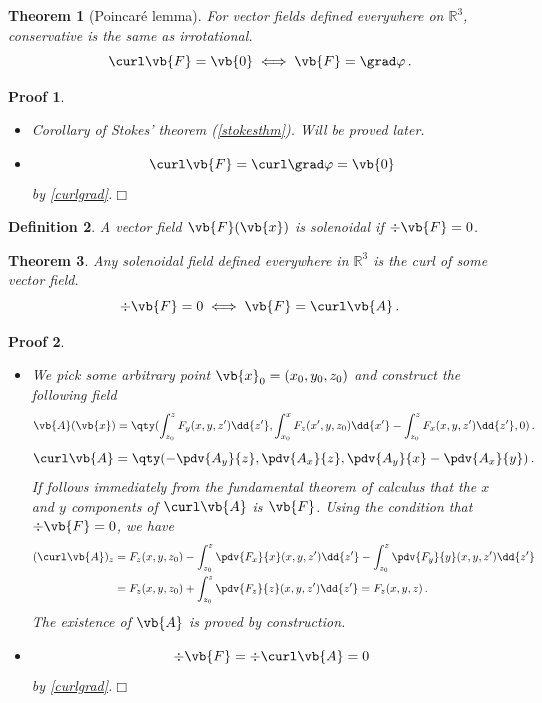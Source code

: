 \documentclass{article}
\theoremstyle{plain}\theoremheaderfont{\normalfont\itshape}\theorembodyfont{\rmfamily}\theoremseparator{.}\newtheorem*{rem}{Remark}\newtheorem*{ex}{Example}\newtheorem*{proof}{Proof}\newtheorem*{altp}{Alternative proof}
\theoremstyle{plain}\theoremheaderfont{\normalfont\bfseries}\theorembodyfont{\rmfamily}\theoremseparator{.}\newtheorem{thm}{Theorem}[section]\newtheorem{lem}[thm]{Lemma}\newtheorem{prop}[thm]{Proposition}\newtheorem*{cor}{Corollary}\newtheorem{defn}[thm]{Definition}\newtheorem{clm}[thm]{Claim}\newtheorem{clminproof}{Claim}
\theoremstyle{break}\theoremheaderfont{\normalfont\itshape}\theorembodyfont{\rmfamily}\theoremseparator{.\medskip}\newtheorem*{proofskip}{Proof}\newtheorem*{exs}{Examples}\newtheorem*{rems}{Remarks}
\theoremstyle{break}\theoremheaderfont{\normalfont\bfseries}\theorembodyfont{\rmfamily}\theoremseparator{.\medskip}\newtheorem{lemskip}[thm]{Lemma}\newtheorem{defnskip}[thm]{Definition}\newtheorem{propskip}[thm]{Proposition}\newtheorem{thmskip}[thm]{Theorem}
\numberwithin{equation}{section}
\newcommand{\qed}{\hfill\ensuremath{\Box}}
\begin{document}
	\begin{thm}[Poincar\'{e} lemma]\label{poincare}
		For vector fields defined everywhere on \(\mathbb{R}^3\), conservative is the same as irrotational.
		\[\curl\vb{F}=\vb{0}\iff\vb{F}=\grad\varphi\,.\]
	\end{thm}
	\begin{proofskip}
		\begin{itemize}
			\item[(\(\Rightarrow\))] Corollary of Stokes' theorem (\cref{stokesthm}). Will be proved later.
			\item[(\(\Leftarrow\))]
			\[\curl\vb{F}=\curl\grad\varphi=\vb{0}\]
			by \cref{curlgrad}.\qed
		\end{itemize}
	\end{proofskip}

	\begin{defn}
		A vector field \(\vb{F}(\vb{x})\) is \textit{solenoidal} if \(\div{\vb{F}}=0\).
	\end{defn}
	\begin{thm}
		Any solenoidal field defined everywhere in \(\mathbb{R}^3\) is the curl of some vector field.
		\[\div\vb{F}=0\iff\vb{F}=\curl\vb{A}\,.\]
	\end{thm}
	\begin{proofskip}
		\begin{itemize}
			\item[(\(\Rightarrow\))] We pick some arbitrary point \(\vb{x}_0=(x_0,y_0,z_0)\) and construct the following field
			\[\vb{A}(\vb{x})=\qty(\int_{z_0}^{z}F_y(x,y,z')\dd{z'},\int_{x_0}^{x}F_z(x',y,z_0)\dd{x'}-\int_{z_0}^{z}F_x(x,y,z')\dd{z'},0)\,.\]
			\[\curl\vb{A}=\qty(-\pdv{A_y}{z},\pdv{A_x}{z},\pdv{A_y}{x}-\pdv{A_x}{y})\,.\]
			If follows immediately from the fundamental theorem of calculus that the \(x\) and \(y\) components of \(\curl\vb{A}\) is \(\vb{F}\). Using the condition that \(\div\vb{F}=0\), we have
			\begin{align*}
				(\curl\vb{A})_z&=F_z(x,y,z_0)-\int_{z_0}^{z}\pdv{F_x}{x}(x,y,z')\dd{z'}-\int_{z_0}^{z}\pdv{F_y}{y}(x,y,z')\dd{z'}\\
				&=F_z(x,y,z_0)+\int_{z_0}^{z}\pdv{F_z}{z}(x,y,z')\dd{z'}=F_z(x,y,z)\,.
			\end{align*}
			The existence of \(\vb{A}\) is proved by construction.
			\item[(\(\Leftarrow\))]
			\[\div\vb{F}=\div\curl\vb{A}=0\]
			by \cref{curlgrad}.\qed
		\end{itemize}
	\end{proofskip}
\end{document}
